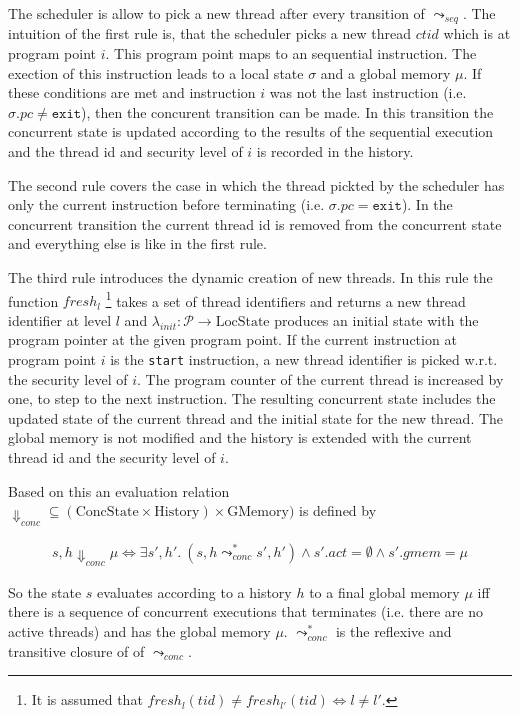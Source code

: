 \documentclass[a4paper,10pt]{llncs}
\begin{document}
The scheduler is allow to pick a new thread after every transition of $\leadsto_{seq}$. The
intuition of the first rule is, that the scheduler picks a new thread $ctid$ which is at
program point $i$. This program point maps to an sequential instruction. The exection of
this instruction leads to a local state $\sigma$ and a global memory $\mu$. If these conditions
are met and instruction $i$ was not the last instruction (i.e. $\sigma.pc \neq \mathtt{exit}$),
then the concurent transition can be made. In this transition the concurrent state is updated
according to the results of the sequential execution and the thread id and security level of $i$
is recorded in the history.

The second rule covers the case in which the thread pickted by the scheduler has only the current
instruction before terminating (i.e. $\sigma.pc = \mathtt{exit}$). In the concurrent transition
the current thread id is removed from the concurrent state and everything else is like in the
first rule.

The third rule introduces the dynamic creation of new threads. In this rule the function $fresh_{l}$
\footnote{It is assumed that $fresh_l(tid) \neq fresh_{l'}(tid) \Leftrightarrow l \neq l'$.}
takes a set of thread identifiers and returns a new thread identifier at level $l$ and $\lambda_{init} : \mathcal{P}
\rightarrow \text{LocState}$ produces an initial state with the program pointer at the given program point.
If the current instruction at program point $i$ is the \texttt{start} instruction, a new thread
identifier is picked w.r.t. the security level of $i$. The program counter of the current thread
is increased by one, to step to the next instruction. The resulting concurrent state includes the
updated state of the current thread and the initial state for the new thread. The global memory
is not modified and the history is extended with the current thread id and the security level of $i$.

Based on this an evaluation relation $\Downarrow_{conc} \subseteq (\text{ConcState} \times \text{History}) \times
\text{GMemory})$ is defined by

\begin{align*}
s, h \Downarrow_{conc} \mu \Leftrightarrow \exists s', h'.\ (s,h \leadsto_{conc}^* s',h') \land s'.act = \emptyset \land s'.gmem = \mu
\end{align*}

So the state $s$ evaluates according to a history $h$ to a final global memory $\mu$ iff there is a
sequence of concurrent executions that terminates (i.e. there are no active threads) and has the
global memory $\mu$. $\leadsto_{conc}^*$ is the reflexive and transitive closure of of $\leadsto_{conc}$.
\end{document}
